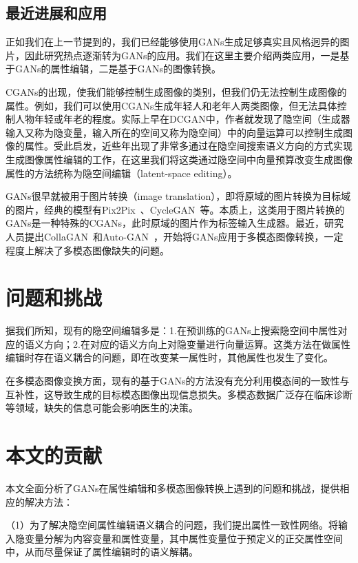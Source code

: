 \subsection{最近进展和应用}

正如我们在上一节提到的，我们已经能够使用GANs生成足够真实且风格迥异的图片，因此研究热点逐渐转为GANs的应用。我们在这里主要介绍两类应用，一是基于GANs的属性编辑，二是基于GANs的图像转换。

CGANs的出现，使我们能够控制生成图像的类别，但我们仍无法控制生成图像的属性。例如，我们可以使用CGANs生成年轻人和老年人两类图像，但无法具体控制人物年轻或年老的程度。实际上早在DCGAN中，作者就发现了隐空间（生成器输入又称为隐变量，输入所在的空间又称为隐空间）中的向量运算可以控制生成图像的属性。受此启发，近些年出现了非常多通过在隐空间搜索语义方向的方式实现生成图像属性编辑的工作\cite{icml2020, harkonen2020ganspace, iclr2021, interfacegan, steer,variation}，在这里我们将这类通过隐空间中向量预算改变生成图像属性的方法统称为隐空间编辑（latent-space editing）。

GANs很早就被用于图片转换（image translation），即将原域的图片转换为目标域的图片，经典的模型有Pix2Pix~\cite{pix2pix}、CycleGAN~\cite{cyclegan}等。本质上，这类用于图片转换的GANs是一种特殊的CGANs，此时原域的图片作为标签输入生成器。最近，研究人员提出CollaGAN~\cite{collagan}和Auto-GAN~\cite{AutoGAN}，开始将GANs应用于多模态图像转换，一定程度上解决了多模态图像缺失的问题。


\section{问题和挑战}

据我们所知，现有的隐空间编辑多是：1.在预训练的GANs上搜索隐空间中属性对应的语义方向；2.在对应的语义方向上对隐变量进行向量运算。这类方法在做属性编辑时存在语义耦合的问题，即在改变某一属性时，其他属性也发生了变化。

在多模态图像变换方面，现有的基于GANs的方法没有充分利用模态间的一致性与互补性，这导致生成的目标模态图像出现信息损失。多模态数据广泛存在临床诊断等领域，缺失的信息可能会影响医生的决策。

\section{本文的贡献}

本文全面分析了GANs在属性编辑和多模态图像转换上遇到的问题和挑战，提供相应的解决方法：

（1）为了解决隐空间属性编辑语义耦合的问题，我们提出属性一致性网络。将输入隐变量分解为内容变量和属性变量，其中属性变量位于预定义的正交属性空间中，从而尽量保证了属性编辑时的语义解耦。

